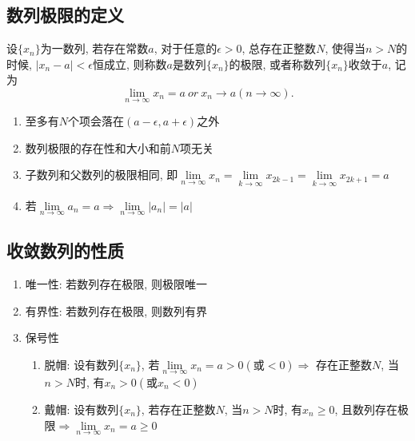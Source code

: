 \subsection{数列极限的定义}
设$ \{x_{n}\} $为一数列, 若存在常数$ a $, 对于任意的$ \epsilon >0 $, 总存在正整数$ N $, 使得当$ n>N $的时候, $ |x_{n}-a|<\epsilon $恒成立, 则称数$ a $是数列$ \{x_{n}\} $的极限, 或者称数列$ \{x_{n}\} $收敛于$ a $, 记为
\begin{equation*}
\lim_{n\rightarrow \infty} x_{n} = a\ or\ x_{n}\rightarrow a(n\rightarrow \infty).
\end{equation*}\par
\begin{tcolorbox}
\begin{enumerate}
\item 至多有$ N $个项会落在$ (a-\epsilon,a+\epsilon) $之外
\item 数列极限的存在性和大小和前$ N $项无关
\item 子数列和父数列的极限相同, 即$ \lim\limits_{n \rightarrow \infty}x_{n}=\lim\limits_{k \rightarrow \infty}x_{2k-1}=\lim\limits_{k \rightarrow \infty}x_{2k+1}=a $
\item 若$ \lim\limits_{n \rightarrow \infty}a_{n}=a\Rightarrow \lim\limits_{n \rightarrow \infty}|a_{n}|=|a| $
\end{enumerate}
\end{tcolorbox}
\subsection{收敛数列的性质}
\begin{enumerate}
\item 唯一性: 若数列存在极限, 则极限唯一
\item 有界性: 若数列存在极限, 则数列有界
\item 保号性
\begin{enumerate}
\item 脱帽: 设有数列$ \{x_{n}\} $, 若$ \lim\limits_{n\rightarrow \infty}x_{n}=a>0(\text{或}<0)\Rightarrow $ 存在正整数$ N $, 当$ n>N $时, 有$ x_{n}>0(\text{或}x_{n}<0) $
\item 戴帽: 设有数列$ \{x_{n}\} $, 若存在正整数$ N $, 当$ n>N $时, 有$ x_{n}\ge 0 $, 且数列存在极限$ \Rightarrow \lim\limits_{n\rightarrow \infty}x_{n}=a\ge 0 $
\end{enumerate}
\end{enumerate}
